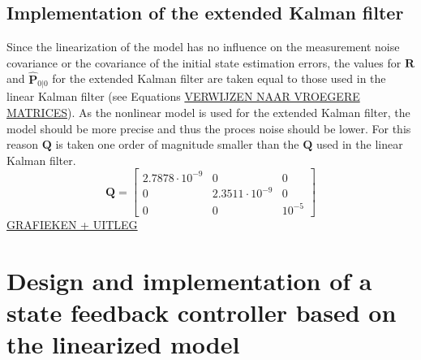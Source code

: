 \documentclass[a4paper,kul]{kulakarticle} %
\begin{document}
\subsection{Implementation of the extended Kalman filter}
Since the linearization of the model has no influence on the measurement noise covariance or the covariance of the initial state estimation errors, the values for $\mathbf{R}$ and $\mathbf{\hat{P}}_{0|0}$ for the extended Kalman filter are taken equal to those used in the linear Kalman filter (see Equations \underline{VERWIJZEN NAAR VROEGERE MATRICES}). As the nonlinear model is used for the extended Kalman filter, the model should be more precise and thus the proces noise should be lower. For this reason $\mathbf{Q}$ is taken one order of magnitude smaller than the $\mathbf{Q}$ used in the linear Kalman filter. 
\begin{equation}
	\mathbf{Q} = \begin{bmatrix}
	2.7878\cdot10^{-9}&0&0\\0&2.3511\cdot10^{-9}&0\\0&0&10^{-5}
	\end{bmatrix}
	\end{equation}
	\underline{GRAFIEKEN + UITLEG}
	
	\section{Design and implementation of a state feedback controller based on the linearized model}
\end{document}

